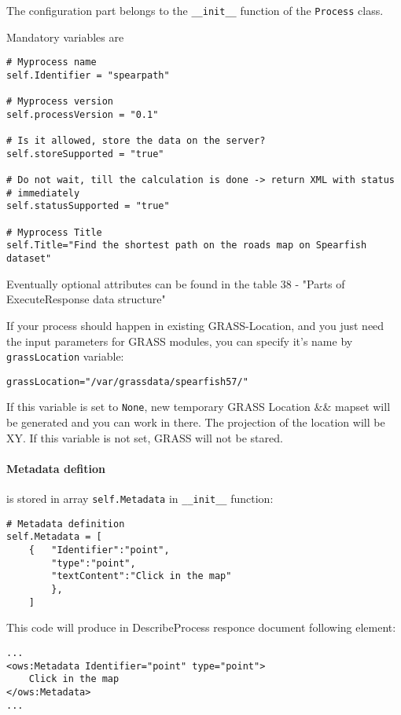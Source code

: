 \documentclass[a4paper,11pt]{article}
\begin{document}
    The configuration part belongs to the \texttt{\_\_init\_\_} function of the	\texttt{Process} class.
     
     
    Mandatory variables are
     

    \begin{verbatim}
# Myprocess name
self.Identifier = "spearpath"

# Myprocess version
self.processVersion = "0.1"

# Is it allowed, store the data on the server?
self.storeSupported = "true"

# Do not wait, till the calculation is done -> return XML with status
# immediately
self.statusSupported = "true"

# Myprocess Title
self.Title="Find the shortest path on the roads map on Spearfish dataset"
    \end{verbatim}

     
    Eventually optional attributes can be found in the table 38 - "Parts of
    ExecuteResponse data structure"
     

     
    If your process should happen in existing GRASS-Location, and you just need
    the input parameters for GRASS modules, you can specify it's name by
    \texttt{grassLocation} variable:
     

    \begin{verbatim}
grassLocation="/var/grassdata/spearfish57/"
    \end{verbatim}

     
If this variable is  set to \texttt{None}, new temporary GRASS Location \&\& mapset will be
generated and you can work in there. The projection of the location will be
XY. If this variable is not set, GRASS will not be stared.

\paragraph{Metadata defition} is stored in array \texttt{self.Metadata} in
\texttt{\_\_init\_\_} function:
\begin{verbatim}
# Metadata definition
self.Metadata = [
    {   "Identifier":"point",
        "type":"point",
        "textContent":"Click in the map"
        },
    ]
\end{verbatim}

This code will produce in DescribeProcess responce document following
element:
\begin{verbatim}
...
<ows:Metadata Identifier="point" type="point">
    Click in the map
</ows:Metadata>
...
\end{verbatim}
\end{document}

